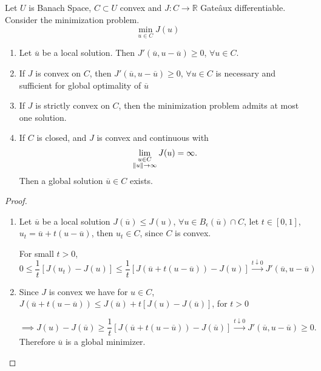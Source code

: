 \begin{theorem}
	Let $U$ is Banach Space, $C \subset U$ convex and $J: C \rightarrow \mathbb{R}$ Gate\^aux differentiable. Consider the minimization problem.
	\[
	 \min_{u\in C} J(u)
	\]
	\begin{enumerate}
		\item Let $\overline{u}$ be a local solution. Then $J'(\overline{u}, u-\overline{u})\geq 0$, $\forall u\in C$.
		\item If $J$ is convex on $C$, then $J'(\overline{u}, u-\overline{u})\geq 0$, $\forall u\in C$ is necessary and sufficient for global optimality of $\overline{u}$
		\item If $J$ is strictly convex on $C$, then the minimization problem admits at most one solution.
		\item If $C$ is closed, and $J$ is convex and continuous with
		\[
			\lim\limits_{\substack{u \in C\\ \left\lVert u\right\rVert\rightarrow \infty }}  J(u) = \infty.
		\] 
		Then a global solution $\overline{u} \in C$ exists.
	\end{enumerate}
\begin{proof}
	\
	\begin{enumerate}
		\item Let $\overline{u}$ be a local solution $J(\overline{u})\leq J(u)$, $\forall u \in B_\epsilon (\overline{u}) \cap C$, let $t\in[0,1]$, $u_t=\overline{u}+t(u-\overline{u})$, then $u_t \in C$, since $C$ is convex. 
		
		For small $t>0$, 
		\[
		 0\leq \frac{1}{t}\left[J(u_t)-J(u)\right]\leq\frac{1}{t}\left[J(\overline{u}+t(u-\overline{u}))-J(u)\right]\xrightarrow{t \downarrow 0} J'(\overline{u}, u-\overline{u})
		\]
		
		\item Since $J$ is convex we have for $u\in C$, $J(\overline{u}+t(u-\overline{u})) \leq J(\overline{u})+t\left[J(u)-J(\overline{u})\right]$, for $t>0$
		
	\[
		\implies 	J(u)-J(\overline{u})\geq\frac{1}{t}\left[J(\overline{u}+t(u-\overline{u}))-J(\overline{u})\right] \xrightarrow{t \downarrow 0} J'(\overline{u}, u-\overline{u}) \geq 0.
	\]
	Therefore $\overline{u}$ is a global minimizer.
	

\end{enumerate}
\end{proof}
\end{theorem}
